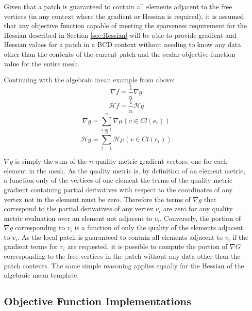 \documentclass{article}
\begin{document}
Given that a patch is guaranteed to contain all elements adjacent to the free vertices (in any context where the gradient or Hessian is required), it is assumed that any objective function capable of meeting the sparseness requirement for the Hessian described in Section \ref{sec:Hessian} will be able to provide gradient and Hessian values for a patch in a BCD context without needing to know any data other than the contents of the current patch and the scalar objective function value for the entire mesh.

Continuing with the algebraic mean example from above:
\begin{displaymath} 
\nabla f = \frac{1}{n} \nabla g
\end{displaymath}
\begin{displaymath}
\mathcal{H} f = \frac{1}{n} \mathcal{H} g
\end{displaymath}
\begin{displaymath}
\nabla g = \sum_{i=1}^{n} \nabla \mu(v \in Cl(e_i))
\end{displaymath}
\begin{displaymath}
\mathcal{H} g = \sum_{i=1}^{n} \mathcal{H} \mu(v \in Cl(e_i))
\end{displaymath}

$\nabla g$ is simply the sum of the $n$ quality metric gradient vectors, one for each element in the mesh.  As the quality metric is, by definition of an element metric, a function only of the vertices of one element the terms of the quality metric gradient containing partial derivatives with respect to the coordinates of any vertex not in the element must be zero.  Therefore the terms of $\nabla g$ that correspond to the partial derivatives of any vertex $v_i$ are zero for any quality metric evaluation over an element not adjacent to $v_i$.  Conversely, the portion of $\nabla g$ corresponding to $v_i$ is a function of only the quality of the elements adjacent to $v_i$.  As the local patch is guaranteed to contain all elements adjacent to $v_i$ if the gradient terms for $v_i$ are requested, it is possible to compute the portion of $\nabla G$ corresponding to the free vertices in the patch without any data other than the patch contents.  The same simple reasoning applies equally for the Hessian of the algebraic mean template.

\subsection{Objective Function Implementations}
\label{sec:objfunc_impl}
\end{document}
